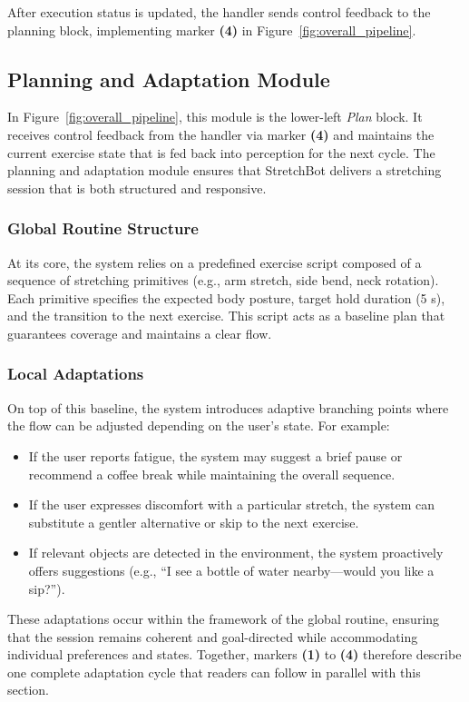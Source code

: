 After execution status is updated, the handler sends control feedback to the planning block, implementing marker \textbf{(4)} in Figure~\ref{fig:overall_pipeline}.

\subsection{Planning and Adaptation Module}

In Figure~\ref{fig:overall_pipeline}, this module is the lower-left \textit{Plan} block. It receives control feedback from the handler via marker \textbf{(4)} and maintains the current exercise state that is fed back into perception for the next cycle. The planning and adaptation module ensures that StretchBot delivers a stretching session that is both structured and responsive.

\subsubsection{Global Routine Structure}
At its core, the system relies on a predefined exercise script composed of a sequence of stretching primitives (e.g., arm stretch, side bend, neck rotation). Each primitive specifies the expected body posture, target hold duration (5 s), and the transition to the next exercise. This script acts as a baseline plan that guarantees coverage and maintains a clear flow.

\subsubsection{Local Adaptations}
On top of this baseline, the system introduces adaptive branching points where the flow can be adjusted depending on the user's state. For example:

\begin{itemize}
\item If the user reports fatigue, the system may suggest a brief pause or recommend a coffee break while maintaining the overall sequence.
\item If the user expresses discomfort with a particular stretch, the system can substitute a gentler alternative or skip to the next exercise.
\item If relevant objects are detected in the environment, the system proactively offers suggestions (e.g., ``I see a bottle of water nearby—would you like a sip?'').
\end{itemize}

These adaptations occur within the framework of the global routine, ensuring that the session remains coherent and goal-directed while accommodating individual preferences and states. Together, markers \textbf{(1)} to \textbf{(4)} therefore describe one complete adaptation cycle that readers can follow in parallel with this section.
